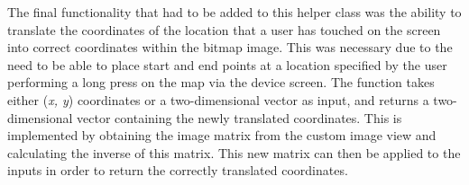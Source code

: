 \documentclass[main.tex]{subfiles}
\begin{document}
                    The final functionality that had to be added to this helper class was the ability to translate the coordinates of the location that a user has touched on the screen
                    into correct coordinates within the bitmap image. This was necessary due to the need to be able to place start and end points at a location specified by the user
                    performing a long press on the map via the device screen. The function takes either (\textit{x, y}) coordinates or a two-dimensional vector as input, and returns a
                    two-dimensional vector containing the newly translated coordinates. This is implemented by obtaining the image matrix from the custom image view and calculating
                    the inverse of this matrix. This new matrix can then be applied to the inputs in order to return the correctly translated coordinates.
\end{document}
